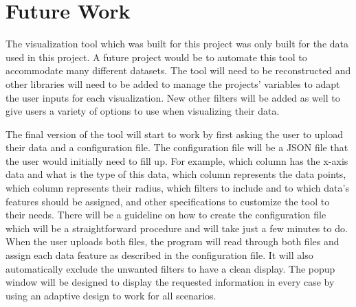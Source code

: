 \section{Future Work}

The visualization tool which was built for this project was only built for the data used in this project. A future project would be to automate this tool to accommodate many different datasets. The tool will need to be reconstructed and other libraries will need to be added to manage the projects' variables to adapt the user inputs for each visualization. New other filters will be added as well to give users a variety of options to use when visualizing their data. 


The final version of the tool will start to work by first asking the user to upload their data and a configuration file. The configuration file will be a JSON file that the user would initially need to fill up. For example, which column has the x-axis data and what is the type of this data, which column represents the data points, which column represents their radius, which filters to include and to which data's features should be assigned, and other specifications to customize the tool to their needs. There will be a guideline on how to create the configuration file which will be a straightforward procedure and will take just a few minutes to do. When the user uploads both files, the program will read through both files and assign each data feature as described in the configuration file. It will also automatically exclude the unwanted filters to have a clean display. The popup window will be designed to display the requested information in every case by using an adaptive design to work for all scenarios.  